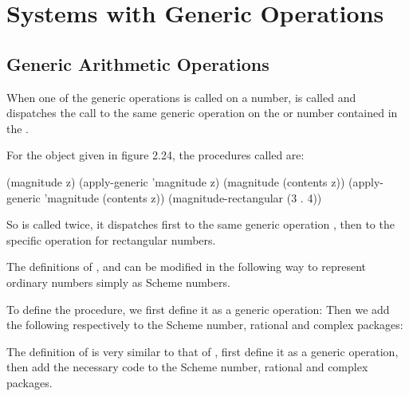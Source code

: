 \section{Systems with Generic Operations}

\subsection{Generic Arithmetic Operations}

\begin{exe}[2.77]
    When one of the generic operations is called on a  number, 
     is called and dispatches the call to the same generic 
    operation on the  or  number contained in the 
    .

    For the object  given in figure 2.24, the procedures called are:
    \begin{cscm}
        (magnitude z)
        (apply-generic 'magnitude z)
        (magnitude (contents z))
        (apply-generic 'magnitude (contents z))
        (magnitude-rectangular (3 . 4))
    \end{cscm}
    So  is called twice, it dispatches first to the same 
    generic operation , then to the specific operation for 
    rectangular numbers.
\end{exe}

\begin{exe}[2.78]
    The definitions of ,  and  
    can be modified in the following way to represent ordinary numbers simply as 
    Scheme numbers.
\end{exe}

\begin{exe}[2.79]
    To define the  procedure, we first define it as a generic 
    operation:
    Then we add the following respectively to the Scheme number, rational and 
    complex packages:
\end{exe}

\begin{exe}[2.80]
    The definition of  is very similar to that of , 
    first define it as a generic operation, then add the necessary code to the 
    Scheme number, rational and complex packages.
\end{exe}

